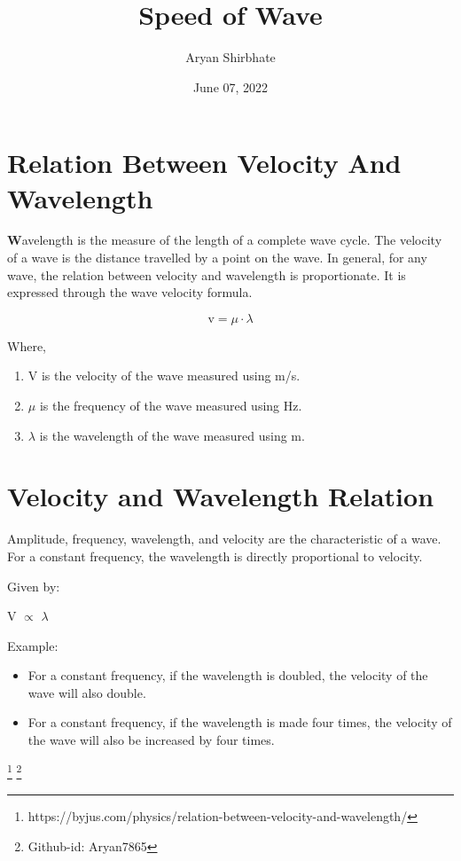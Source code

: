 \documentclass[12pt,a4paper]{article}
\author{Aryan Shirbhate}
\title{Speed of Wave}
\date{June 07, 2022}
\begin{document}
\maketitle

    \maketitle 
    
    \section{Relation Between Velocity And Wavelength} 
    
    \textbf Wavelength is the measure of the length of a complete wave cycle. The velocity of a wave is the distance travelled by a point on the wave. In general, for any wave, the relation between velocity and wavelength is proportionate. It is expressed through the wave velocity formula. 


    
    \begin{equation}
    \text{v} = \mu \cdot \lambda
    \label{eqn:v}
\end{equation}




    Where,
\begin{enumerate}
    \item V is the velocity of the wave measured using m/s.
    
    \item $\mu$ is the frequency of the wave measured using Hz.
    
    
    \item $\lambda$ is the wavelength of the wave measured using m.

\end{enumerate} 

\section{Velocity and Wavelength Relation}

Amplitude, frequency, wavelength, and velocity are the characteristic of a wave. For a constant frequency, the wavelength is directly proportional to velocity.

Given by:

V  $\propto$ $\lambda$

Example:

\begin{itemize}
    \item For a constant frequency, if the wavelength is doubled, the velocity of the wave will also double.
    \item For a constant frequency, if the wavelength is made four times, the velocity of the wave will also be increased by four times.
\end{itemize}


    
    
     
\footnote{https://byjus.com/physics/relation-between-velocity-and-wavelength/}
\footnote{Github-id: Aryan7865}
\end{document}
